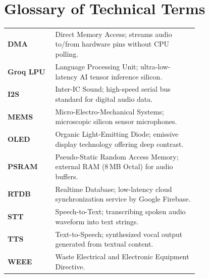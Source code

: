 \documentclass[11pt,a4paper,oneside]{report}
\begin{document}
\chapter{Glossary of Technical Terms}
\begin{tabular}{lp{0.75\linewidth}}
\textbf{DMA} & Direct Memory Access; streams audio to/from hardware pins without CPU polling.\\
\textbf{Groq LPU} & Language Processing Unit; ultra-low-latency AI tensor inference silicon.\\
\textbf{I2S} & Inter-IC Sound; high-speed serial bus standard for digital audio data.\\
\textbf{MEMS} & Micro-Electro-Mechanical Systems; microscopic silicon sensor microphones.\\
\textbf{OLED} & Organic Light-Emitting Diode; emissive display technology offering deep contrast.\\
\textbf{PSRAM} & Pseudo-Static Random Access Memory; external RAM (8\,MB Octal) for audio buffers.\\
\textbf{RTDB} & Realtime Database; low-latency cloud synchronization service by Google Firebase.\\
\textbf{STT} & Speech-to-Text; transcribing spoken audio waveform into text strings.\\
\textbf{TTS} & Text-to-Speech; synthesized vocal output generated from textual content.\\
\textbf{WEEE} & Waste Electrical and Electronic Equipment Directive.\\
\end{tabular}

\printindex
\end{document}

